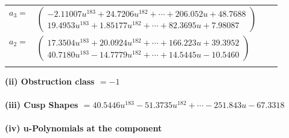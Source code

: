 \documentclass[1p]{elsarticle_modified}
\theoremstyle{definition}
\begin{document}
\begin{tabular}{m{7pt} m{180pt} m{7pt} m{180pt} }
\flushright $a_{3}=$&$\begin{pmatrix}-2.11007 u^{183}+24.7206 u^{182}+\cdots+206.052 u+48.7688\\19.4953 u^{183}+1.85177 u^{182}+\cdots+82.3695 u+7.98087\end{pmatrix}$ \\
\flushright $a_{2}=$&$\begin{pmatrix}17.3504 u^{183}+20.0924 u^{182}+\cdots+166.223 u+39.3952\\40.7180 u^{183}-14.7779 u^{182}+\cdots+14.5445 u-10.5460\end{pmatrix}$\\&\end{tabular}
\flushleft \textbf{(ii) Obstruction class $= -1$}\\~\\
\flushleft \textbf{(iii) Cusp Shapes $= 40.5446 u^{183}-51.3735 u^{182}+\cdots-251.843 u-67.3318$}\\~\\
\newpage\renewcommand{\arraystretch}{1}
\flushleft \textbf{(iv) u-Polynomials at the component}\newline \\
\end{document}
